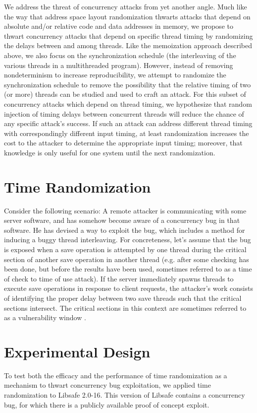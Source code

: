 \documentclass[letterpaper,twocolumn,10pt]{article}
\begin{document}
We address the threat of concurrency attacks from yet another angle.  Much like the way that address space layout randomization thwarts attacks that depend on absolute and/or relative code and data addresses in memory, we propose to thwart concurrency attacks that depend on specific thread timing by randomizing the delays between and among threads.  Like the memoization approach described above, we also focus on the synchronization schedule (the interleaving of the various threads in a multithreaded program).  However, instead of removing nondeterminism to increase reproducibility, we attempt to randomize the synchronization schedule to remove the possibility that the relative timing of two (or more) threads can be studied and used to craft an attack.  For this subset of concurrency attacks which depend on thread timing, we hypothesize that random injection of timing delays between concurrent threads will reduce the chance of any specific attack's success.  If such an attack can address different thread timing with correspondingly different input timing, at least randomization increases the cost to the attacker to determine the appropriate input timing; moreover, that knowledge is only useful for one system until the next randomization.

\section{Time Randomization}
Consider the following scenario: A remote attacker is communicating with some server software, and has somehow become aware of a concurrency bug in that software.  He has devised a way to exploit the bug, which includes a method for inducing a buggy thread interleaving.  For concreteness, let's assume that the bug is exposed when a save operation is attempted by one thread during the critical section of another save operation in another thread (e.g. after some checking has been done, but before the results have been used, sometimes referred to as a time of check to time of use attack).  If the server immediately spawns threads to execute save operations in response to client requests, the attacker's work consists of identifying the proper delay between two save threads such that the critical sections intersect.  The critical sections in this context are sometimes referred to as a vulnerability window \cite{Cui2011}.

\section{Experimental Design}
To test both the efficacy and the performance of time randomization as a mechanism to thwart concurrency bug exploitation, we applied time randomization to Libsafe 2.0-16.  This version of Libsafe contains a concurrency bug, for which there is a publicly available proof of concept exploit.
\end{document}
